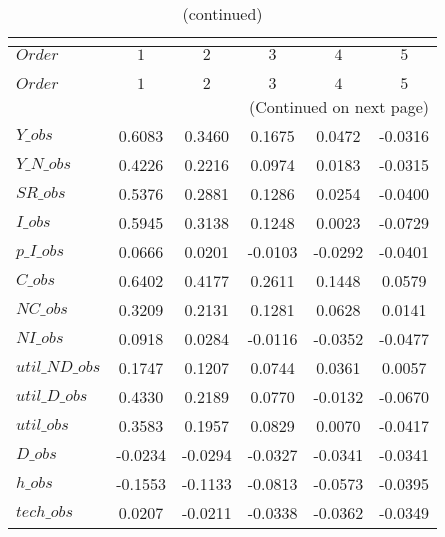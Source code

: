  
\begin{center}
\begin{longtable}{lccccc} 
\caption{COEFFICIENTS OF AUTOCORRELATION}\\
 \label{Table:th_autocorr_matrix}\\
\toprule 
$Order          $	 & 	 $          1$	 & 	 $          2$	 & 	 $          3$	 & 	 $          4$	 & 	 $          5$\\
\midrule \endfirsthead 
\caption{(continued)}\\
 \toprule \\ 
$Order          $	 & 	 $          1$	 & 	 $          2$	 & 	 $          3$	 & 	 $          4$	 & 	 $          5$\\
\midrule \endhead 
\midrule \multicolumn{6}{r}{(Continued on next page)} \\ \bottomrule \endfoot 
\bottomrule \endlastfoot 
$Y\_obs         $	 & 	     0.6083	 & 	     0.3460	 & 	     0.1675	 & 	     0.0472	 & 	    -0.0316 \\ 
$Y\_N\_obs      $	 & 	     0.4226	 & 	     0.2216	 & 	     0.0974	 & 	     0.0183	 & 	    -0.0315 \\ 
$SR\_obs        $	 & 	     0.5376	 & 	     0.2881	 & 	     0.1286	 & 	     0.0254	 & 	    -0.0400 \\ 
$I\_obs         $	 & 	     0.5945	 & 	     0.3138	 & 	     0.1248	 & 	     0.0023	 & 	    -0.0729 \\ 
$p\_I\_obs      $	 & 	     0.0666	 & 	     0.0201	 & 	    -0.0103	 & 	    -0.0292	 & 	    -0.0401 \\ 
$C\_obs         $	 & 	     0.6402	 & 	     0.4177	 & 	     0.2611	 & 	     0.1448	 & 	     0.0579 \\ 
$NC\_obs        $	 & 	     0.3209	 & 	     0.2131	 & 	     0.1281	 & 	     0.0628	 & 	     0.0141 \\ 
$NI\_obs        $	 & 	     0.0918	 & 	     0.0284	 & 	    -0.0116	 & 	    -0.0352	 & 	    -0.0477 \\ 
$util\_ND\_obs  $	 & 	     0.1747	 & 	     0.1207	 & 	     0.0744	 & 	     0.0361	 & 	     0.0057 \\ 
$util\_D\_obs   $	 & 	     0.4330	 & 	     0.2189	 & 	     0.0770	 & 	    -0.0132	 & 	    -0.0670 \\ 
$util\_obs      $	 & 	     0.3583	 & 	     0.1957	 & 	     0.0829	 & 	     0.0070	 & 	    -0.0417 \\ 
$D\_obs         $	 & 	    -0.0234	 & 	    -0.0294	 & 	    -0.0327	 & 	    -0.0341	 & 	    -0.0341 \\ 
$h\_obs         $	 & 	    -0.1553	 & 	    -0.1133	 & 	    -0.0813	 & 	    -0.0573	 & 	    -0.0395 \\ 
$tech\_obs      $	 & 	     0.0207	 & 	    -0.0211	 & 	    -0.0338	 & 	    -0.0362	 & 	    -0.0349 \\ 
\end{longtable}
 \end{center}
